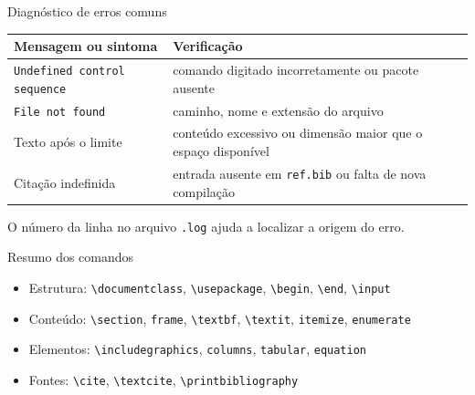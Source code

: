 \begin{frame}[fragile]{Diagnóstico de erros comuns}
\begin{tabular}{p{.27\linewidth}p{.65\linewidth}}
\toprule
Mensagem ou sintoma & Verificação \\
\midrule
\texttt{Undefined control sequence} & comando digitado incorretamente ou pacote ausente \\
\texttt{File not found} & caminho, nome e extensão do arquivo \\
Texto após o limite & conteúdo excessivo ou dimensão maior que o espaço disponível \\
Citação indefinida & entrada ausente em \texttt{ref.bib} ou falta de nova compilação \\
\bottomrule
\end{tabular}

\vspace{.6em}
O número da linha no arquivo \texttt{.log} ajuda a localizar a origem do erro.
\end{frame}

\begin{frame}{Resumo dos comandos}
\begin{itemize}
    \item Estrutura: \texttt{\textbackslash documentclass}, \texttt{\textbackslash usepackage}, \texttt{\textbackslash begin}, \texttt{\textbackslash end}, \texttt{\textbackslash input}
    \item Conteúdo: \texttt{\textbackslash section}, \texttt{frame}, \texttt{\textbackslash textbf}, \texttt{\textbackslash textit}, \texttt{itemize}, \texttt{enumerate}
    \item Elementos: \texttt{\textbackslash includegraphics}, \texttt{columns}, \texttt{tabular}, \texttt{equation}
    \item Fontes: \texttt{\textbackslash cite}, \texttt{\textbackslash textcite}, \texttt{\textbackslash printbibliography}
\end{itemize}
\end{frame}
